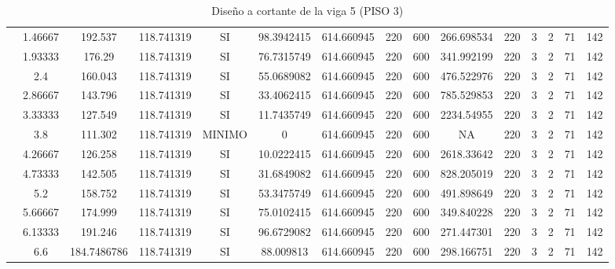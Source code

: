 \begin{table}[H]
{\begin{tabular}{|c|c|c|c|c|c|c|c|c|c|c|c|c|c|c|}
\cline{2-15}    & 1.46667 & 192.537 & 118.741319 & SI  & 98.3942415 & 614.660945 & 220 & 600 & 266.698534 & 220 & 3   & 2   & 71  & 142 \bigstrut\\
\cline{2-15}    & 1.93333 & 176.29 & 118.741319 & SI  & 76.7315749 & 614.660945 & 220 & 600 & 341.992199 & 220 & 3   & 2   & 71  & 142 \bigstrut\\
\cline{2-15}    & 2.4 & 160.043 & 118.741319 & SI  & 55.0689082 & 614.660945 & 220 & 600 & 476.522976 & 220 & 3   & 2   & 71  & 142 \bigstrut\\
\cline{2-15}    & 2.86667 & 143.796 & 118.741319 & SI  & 33.4062415 & 614.660945 & 220 & 600 & 785.529853 & 220 & 3   & 2   & 71  & 142 \bigstrut\\
\cline{2-15}    & 3.33333 & 127.549 & 118.741319 & SI  & 11.7435749 & 614.660945 & 220 & 600 & 2234.54955 & 220 & 3   & 2   & 71  & 142 \bigstrut\\
\cline{2-15}    & 3.8 & 111.302 & 118.741319 & MINIMO & 0   & 614.660945 & 220 & 600 & NA  & 220 & 3   & 2   & 71  & 142 \bigstrut\\
\cline{2-15}    & 4.26667 & 126.258 & 118.741319 & SI  & 10.0222415 & 614.660945 & 220 & 600 & 2618.33642 & 220 & 3   & 2   & 71  & 142 \bigstrut\\
\cline{2-15}    & 4.73333 & 142.505 & 118.741319 & SI  & 31.6849082 & 614.660945 & 220 & 600 & 828.205019 & 220 & 3   & 2   & 71  & 142 \bigstrut\\
\cline{2-15}    & 5.2 & 158.752 & 118.741319 & SI  & 53.3475749 & 614.660945 & 220 & 600 & 491.898649 & 220 & 3   & 2   & 71  & 142 \bigstrut\\
\cline{2-15}    & 5.66667 & 174.999 & 118.741319 & SI  & 75.0102415 & 614.660945 & 220 & 600 & 349.840228 & 220 & 3   & 2   & 71  & 142 \bigstrut\\
\cline{2-15}    & 6.13333 & 191.246 & 118.741319 & SI  & 96.6729082 & 614.660945 & 220 & 600 & 271.447301 & 220 & 3   & 2   & 71  & 142 \bigstrut\\
\cline{2-15}    & 6.6 & 184.7486786 & 118.741319 & SI  & 88.009813 & 614.660945 & 220 & 600 & 298.166751 & 220 & 3   & 2   & 71  & 142 \bigstrut\\
\hline
\end{tabular}%


  

  }%
    \caption{Diseño a cortante de la viga 5 (PISO 3) }
  \label{tab:C VG5 P3 }%
\end{table}%

